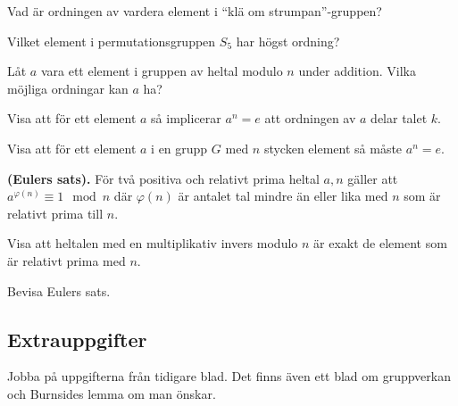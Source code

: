 \documentclass[11pt,fleqn]{book} %
\begin{document}
\begin{problem}
  Vad är ordningen av vardera element i ``klä om strumpan''-gruppen?
\end{problem}

\begin{problem}
  Vilket element i permutationsgruppen \(S_5\) har högst ordning?
\end{problem}

\begin{problem}
  Låt \(a\) vara ett element i gruppen av heltal modulo \(n\) under addition. Vilka möjliga ordningar kan \(a\) ha?
\end{problem}

\begin{problem}
  Visa att för ett element \(a\) så implicerar \(a^n = e\) att ordningen av \(a\) delar talet \(k\).
\end{problem}


\begin{problem}
 Visa att för ett element \(a\) i en grupp \(G\) med \(n\) stycken element så måste \(a ^{n} = e\).
\end{problem}

\begin{theoremeT} \textbf{(Eulers sats).} 
  För två positiva och relativt prima heltal \(a, n\) gäller att \(a ^{\varphi (n)} \equiv 1 \mod n\) där \(\varphi (n)\) är antalet tal mindre än eller lika med \(n\) som är relativt prima till \(n\).

\end{theoremeT}

\begin{problem}
  Visa att heltalen med en multiplikativ invers modulo \(n\) är exakt de element som är relativt prima med \(n\).
\end{problem}


\begin{problem}
  Bevisa Eulers sats.
\end{problem}

\subsection*{Extrauppgifter}
Jobba på uppgifterna från tidigare blad. Det finns även ett blad om gruppverkan och Burnsides lemma om man önskar.
\end{document}
